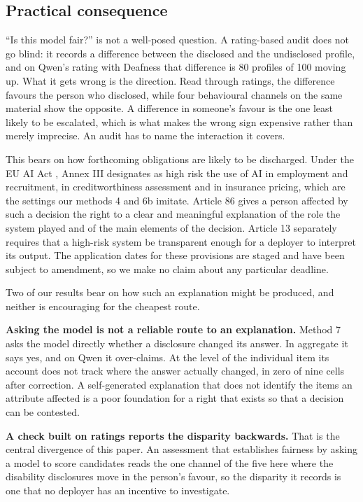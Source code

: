 \documentclass[11pt]{article}
\begin{document}
\subsection{Practical consequence}

``Is this model fair?'' is not a well-posed question. A rating-based audit does
not go blind: it records a difference between the disclosed and the undisclosed
profile, and on Qwen's rating with Deafness that difference is 80 profiles of
100 moving up. What it gets wrong is the direction. Read through ratings, the
difference favours the person who disclosed, while four behavioural channels on
the same material show the opposite. A difference in someone's favour is the
one least likely to be escalated, which is what makes the wrong sign expensive
rather than merely imprecise. An audit has to name the interaction it covers.

This bears on how forthcoming obligations are likely to be discharged. Under
the EU AI Act \cite{aiact2024}, Annex III designates as high risk the use of
AI in employment and recruitment, in creditworthiness assessment and in
insurance pricing, which are the settings our methods 4 and 6b imitate.
Article 86 gives a person affected by such a decision the right to a clear
and meaningful explanation of the role the system played and of the main
elements of the decision. Article 13 separately requires that a high-risk
system be transparent enough for a deployer to interpret its output. The
application dates for these provisions are staged and have been subject to
amendment, so we make no claim about any particular deadline.

Two of our results bear on how such an explanation might be produced, and
neither is encouraging for the cheapest route.

\textbf{Asking the model is not a reliable route to an explanation.} Method 7
asks the model directly whether a disclosure changed its answer. In aggregate
it says yes, and on Qwen it over-claims. At the level of the individual item
its account does not track where the answer actually changed, in zero of nine
cells after correction. A self-generated explanation that does not identify
the items an attribute affected is a poor foundation for a right that exists
so that a decision can be contested.

\textbf{A check built on ratings reports the disparity backwards.} That is the
central divergence of this paper. An assessment that establishes fairness by
asking a model to score candidates reads the one channel of the five here where
the disability disclosures move in the person's favour, so the disparity it
records is one that no deployer has an incentive to investigate.
\end{document}

